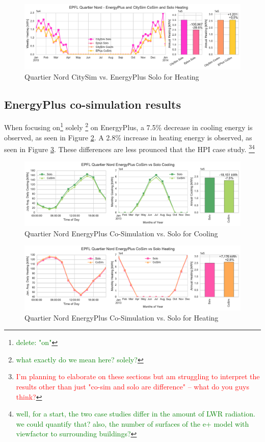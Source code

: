 \documentclass{tBPS2e}
\theoremstyle{plain}
\theoremstyle{definition}
\theoremstyle{remark}
\newcommand{\noteCM}[1]{\footnote{\textcolor{red}{#1}}}
\newcommand{\noteDT}[1]{\footnote{\textcolor{green}{#1}}}
\begin{document}
\begin{figure}[H]
\centering
\includegraphics[scale=0.55]{figures/QN_Heating.pdf}
\caption{Quartier Nord CitySim vs. EnergyPlus Solo for Heating}
\label{fig:qn_eplusvscitysim_heating}
\end{figure}

\subsection{EnergyPlus co-simulation results}

When focusing on\noteDT{delete: "on"} solely \noteDT{what exactly do we mean here? solely?} on EnergyPlus, a 7.5\% decrease in cooling energy is observed, as seen in Figure \ref{fig:qn_eplus_cosimvssolo_cooling}. A 2.8\% increase in heating energy is observed, as seen in Figure \ref{fig:qn_eplus_cosimvssolo_heating}. These differences are less prounced that the HPI case study. \noteCM{I'm planning to elaborate on these sections but am struggling to interpret the results other than just "co-sim and solo are difference" -- what do you guys think?}\noteDT{well, for a start, the two case studies differ in the amount of LWR radiation. we could quantify that? also, the number of surfaces of the e+ model with viewfactor to surrounding buildings?}


\begin{figure}[H]
\centering
\includegraphics[scale=0.55]{figures/QN_EnergyPlus_Cooling}
\caption{Quartier Nord EnergyPlus Co-Simulation vs. Solo for Cooling}
\label{fig:qn_eplus_cosimvssolo_cooling}
\end{figure}


\begin{figure}[H]
\centering
\includegraphics[scale=0.55]{figures/QN_EnergyPlus_Heating}
\caption{Quartier Nord EnergyPlus Co-Simulation vs. Solo for Heating}
\label{fig:qn_eplus_cosimvssolo_heating}
\end{figure}
\end{document}
